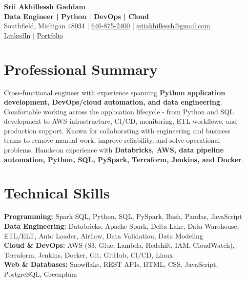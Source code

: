 \documentclass[letterpaper,10pt]{article}
\begin{document}
\fontsize{9.35pt}{10.45pt}\selectfont

\begin{center}
    {\LARGE \textbf{Srii Akhillessh Gaddam}} \\[-1pt]
    \textbf{Data Engineer | Python | DevOps | Cloud} \\[2pt]
    Southfield, Michigan 48034 $|$
    \href{tel:6468752400}{646-875-2400} $|$
    \href{mailto:sriiakhillessh@gmail.com}{sriiakhillessh@gmail.com} \\[1pt]
    \href{https://www.linkedin.com/in/srii-akhiilessh-gaddam-b48668191/}{LinkedIn} $|$
    \href{https://sriiakhillesshg.github.io/portfolio/}{Portfolio}
\end{center}
\vspace{-8pt}

\section{Professional Summary}
\small{Cross-functional engineer with experience spanning \textbf{Python application development, DevOps/cloud automation, and data engineering}. Comfortable working across the application lifecycle - from Python and SQL development to AWS infrastructure, CI/CD, monitoring, ETL workflows, and production support. Known for collaborating with engineering and business teams to remove manual work, improve reliability, and solve operational problems. Hands-on experience with \textbf{Databricks, AWS, data pipeline automation, Python, SQL, PySpark, Terraform, Jenkins, and Docker}.}

\section{Technical Skills}
\small{
\textbf{Programming:} Spark SQL, Python, SQL, PySpark, Bash, Pandas, JavaScript \\
\textbf{Data Engineering:} Databricks, Apache Spark, Delta Lake, Data Warehouse, ETL/ELT, Auto Loader, Airflow, Data Validation, Data Modeling \\
\textbf{Cloud \& DevOps:} AWS (S3, Glue, Lambda, Redshift, IAM, CloudWatch), Terraform, Jenkins, Docker, Git, GitHub, CI/CD, Linux \\
\textbf{Web \& Databases:} Snowflake, REST APIs, HTML, CSS, JavaScript, PostgreSQL, Greenplum
}
\end{document}
